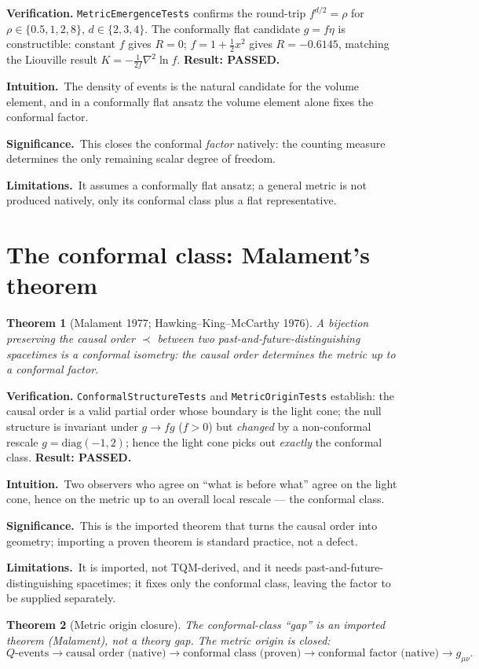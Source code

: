\documentclass[10pt,twoside,openany]{book}
\newtheorem{theorem}{Theorem}[chapter]
\newcommand{\theoremnotes}[3]{%
  \par\medskip\noindent
  \textbf{Intuition.}\ #1\par
  \textbf{Significance.}\ #2\par
  \textbf{Limitations.}\ #3\par}
\begin{document}
\textbf{Verification.} \texttt{MetricEmergenceTests} confirms the round-trip
$f^{d/2}=\rho$ for $\rho\in\{0.5,1,2,8\}$, $d\in\{2,3,4\}$. The conformally flat candidate
$g=f\eta$ is constructible: constant $f$ gives $R=0$; $f=1+\tfrac12 x^2$ gives
$R=-0.6145$, matching the Liouville result $K=-\tfrac1{2f}\nabla^2\ln f$.
\textbf{Result: PASSED.}

\theoremnotes
{The density of events is the natural candidate for the volume element, and in a
conformally flat ansatz the volume element alone fixes the conformal factor.}
{This closes the conformal \emph{factor} natively: the counting measure determines the
only remaining scalar degree of freedom.}
{It assumes a conformally flat ansatz; a general metric is not produced natively, only
its conformal class plus a flat representative.}

\section{The conformal class: Malament's theorem}

\begin{theorem}[Malament 1977; Hawking--King--McCarthy 1976]
A bijection preserving the causal order $\prec$ between two past-and-future-distinguishing
spacetimes is a conformal isometry: the causal order determines the metric \emph{up to a
conformal factor}.
\end{theorem}

\textbf{Verification.} \texttt{ConformalStructureTests} and \texttt{MetricOriginTests}
establish: the causal order is a valid partial order whose boundary is the light cone; the
null structure is invariant under $g\to f g$ ($f>0$) but \emph{changed} by a non-conformal
rescale $g=\mathrm{diag}(-1,2)$; hence the light cone picks out \emph{exactly} the
conformal class. \textbf{Result: PASSED.}

\theoremnotes
{Two observers who agree on ``what is before what'' agree on the light cone, hence on the
metric up to an overall local rescale --- the conformal class.}
{This is the imported theorem that turns the causal order into geometry; importing a
proven theorem is standard practice, not a defect.}
{It is imported, not TQM-derived, and it needs past-and-future-distinguishing spacetimes;
it fixes only the conformal class, leaving the factor to be supplied separately.}

\begin{theorem}[Metric origin closure]
The conformal-class ``gap'' is an \emph{imported theorem} (Malament), not a theory gap.
The metric origin is closed:
\begin{equation}
Q\text{-events} \to \text{causal order (native)}
\to \text{conformal class (proven)}
\to \text{conformal factor (native)}
\to g_{\mu\nu}.
\end{equation}
\end{theorem}
\end{document}

